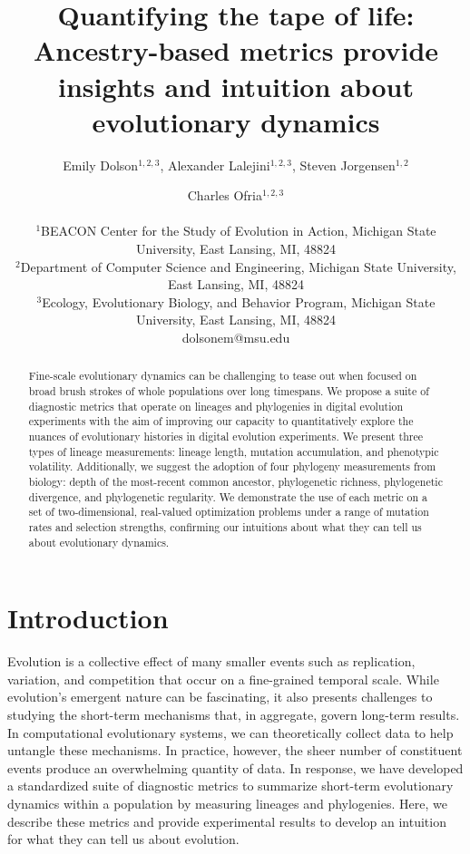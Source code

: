 \documentclass[letterpaper]{article}
\title{Quantifying the tape of life: Ancestry-based metrics provide insights and intuition about evolutionary dynamics}
\author{Emily Dolson$^{1,2,3}$, Alexander Lalejini$^{1,2, 3}$, Steven Jorgensen$^{1,2}$ \and Charles Ofria$^{1,2, 3}$ \\
\mbox{}\\
$^1$BEACON Center for the Study of Evolution in Action, Michigan State University, East Lansing, MI, 48824 \\
$^2$Department of Computer Science and Engineering, Michigan State University, East Lansing, MI, 48824 \\
$^3$Ecology, Evolutionary Biology, and Behavior Program, Michigan State University, East Lansing, MI, 48824 \\
dolsonem@msu.edu} %
\begin{document}
\maketitle

\begin{abstract}
Fine-scale evolutionary dynamics can be challenging to tease out when focused on broad brush strokes of whole populations over long timespans.
We propose a suite of diagnostic metrics that operate on lineages and phylogenies in digital evolution experiments with the aim of improving our capacity to quantitatively explore the nuances of evolutionary histories in digital evolution experiments.
We present three types of lineage measurements: lineage length, mutation accumulation, and phenotypic volatility. 
Additionally, we suggest the adoption of four phylogeny measurements from biology: depth of the most-recent common ancestor, phylogenetic richness, phylogenetic divergence, and phylogenetic regularity. 
We demonstrate the use of each metric on a set of two-dimensional, real-valued optimization problems under a range of mutation rates and selection strengths, confirming our intuitions about what they can tell us about evolutionary dynamics. 

\end{abstract}

\section{Introduction}

Evolution is a collective effect of many smaller events such as replication, variation, and competition that occur on a fine-grained temporal scale. While evolution's emergent nature can be fascinating, it also presents challenges to studying the short-term mechanisms that, in aggregate, govern long-term results. In computational evolutionary systems, we can theoretically collect data to help untangle these mechanisms. In practice, however, the sheer number of constituent events produce an overwhelming quantity of data.
In response, we have developed a standardized suite of diagnostic metrics to summarize short-term evolutionary dynamics within a population by measuring lineages and phylogenies. Here, we describe these metrics and provide experimental results to develop an intuition for what they can tell us about evolution.
\end{document}
